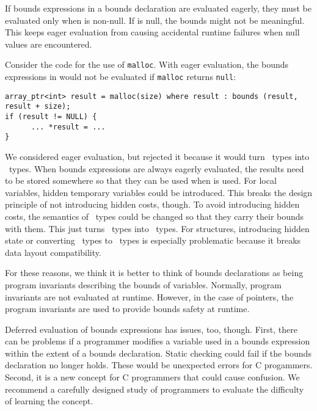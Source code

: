 If bounds expressions in a bounds declaration  are evaluated 
eagerly, they must  be evaluated only when  is non-null. If  is null,
the bounds might not be meaningful.  This keeps eager evaluation from
causing accidental runtime failures when null values are encountered.    

Consider the code for the use of \texttt{malloc}.   With eager evaluation,
the bounds expressions in  would not
be evaluated if \texttt{malloc} returns \texttt{null}:
\begin{verbatim}
array_ptr<int> result = malloc(size) where result : bounds (result, result + size);
if (result != NULL) {
      ... *result = ...
}
\end{verbatim}

We considered eager evaluation, but rejected it because it would turn \arrayptr\
types into \arrayview\ types.  When bounds expressions are always eagerly
evaluated, the results need to be stored somewhere so that they can be used
when \var{v} is used.  For local variables, hidden temporary variables could be
introduced.  This breaks the design principle of not introducing hidden
costs, though.  To avoid introducing hidden costs, the semantics of \arrayptr\ types could 
be changed so that they carry their bounds with them.   This just turns \arrayptr\ types into 
\arrayview\ types.   For structures, introducing hidden state or converting \arrayptr\ types to 
\arrayview\ types is especially problematic because it breaks data layout compatibility.

For these reasons, we think it is better to think of bounds declarations as being
program invariants describing the bounds of variables.   Normally, 
program invariants are not evaluated at runtime.  However, in the case of pointers,
the program invariants are used to provide bounds safety at runtime.

Deferred evaluation of bounds expressions has issues, too, though. First, there
can be problems if a programmer modifies a variable used in a bounds expression
within the extent of a bounds declaration.  Static checking could fail if the
bounds declaration no longer holds.  These would be unexpected errors for
C progammers.  Second, it is a new concept for C programmers that could
cause confusion.  We recommend a carefully designed study of
programmers to evaluate the difficulty of learning the concept.

